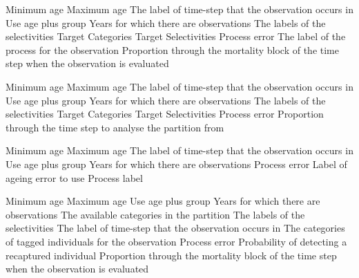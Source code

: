  {Minimum age}
 {Maximum age}
 {The label of time-step that the observation occurs in}
 {Use age plus group}
 {Years for which there are observations}
 {The labels of the selectivities}
 {Target Categories}
 {Target Selectivities}
 {Process error}
 {The label of the process for the observation}
 {Proportion through the mortality block of the time step when the observation is evaluated}
\par\textbf{}\par
{} {Minimum age}
 {Maximum age}
 {The label of time-step that the observation occurs in}
 {Use age plus group}
 {Years for which there are observations}
 {The labels of the selectivities}
 {Target Categories}
 {Target Selectivities}
 {Process error}
 {Proportion through the time step to analyse the partition from}
\par\textbf{}\par
{} {Minimum age}
 {Maximum age}
 {The label of time-step that the observation occurs in}
 {Use age plus group}
 {Years for which there are observations}
 {Process error}
 {Label of ageing error to use}
 {Process label}
\par\textbf{}\par
{} {Minimum age}
 {Maximum age}
 {Use age plus group}
 {Years for which there are observations}
 {The available categories in the partition}
 {The labels of the selectivities}
 {The label of time-step that the observation occurs in}
 {The categories of tagged individuals for the observation}
 {Process error}
 {Probability of detecting a recaptured individual}
 {Proportion through the mortality block of the time step when the observation is evaluated}
